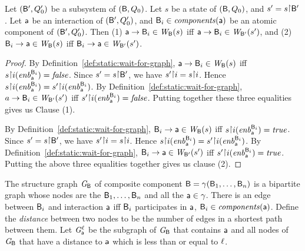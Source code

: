 \begin{proposition} \label{prop:edge-projection}
Let $(\mathsf{B}', Q'_0)$ be a subsystem of $(\mathsf{B}, Q_0)$. Let $s$ be a state of
$(\mathsf{B}, Q_0)$, and $s' = s \pj \B'$.  Let $\mathsf{a}$ be an interaction of
$(\mathsf{B}', Q'_0)$, and $\mathsf{B}_i \in \mathit{components}(\mathsf{a})$ be an atomic component of
$(\mathsf{B}', Q'_0)$.  Then (1) $\mathsf{a} \rightarrow \mathsf{B}_i \in \mathit{W}_{\mathsf{B}}({s})$ iff
$\mathsf{a} \rightarrow \mathsf{B}_i \in \mathit{W}_{\mathsf{B}'}({s'})$, and (2)
$\mathsf{B}_i \rightarrow \mathsf{a} \in \mathit{W}_{\mathsf{B}}({s})$ iff $\mathsf{B}_i \rightarrow \mathsf{a} \in \mathit{W}_{\mathsf{B}'}({s'})$.
\end{proposition}
%
\begin{proof}
By Definition~\ref{def:static:wait-for-graph}, $\mathsf{a} \rightarrow \mathsf{B}_i \in \mathit{W}_{\mathsf{B}}({s})$ iff $s \pj i (\gd{\act}{\B_i}) = \false$.
Since $s' = s \pj \B'$, we have $s' \pj i = s \pj i$. Hence
$s \pj i (\gd{\act}{\B_i}) = s' \pj i (\gd{\act}{\B_i})$.
By Definition~\ref{def:static:wait-for-graph}, 
$a \rightarrow \mathsf{B}_i \in \mathit{W}_{\mathsf{B}'}({s'})$ iff $s' \pj i (\gd{\act}{\B_i}) = \false$.
Putting together these three equalities gives us Clause (1).

By Definition~\ref{def:static:wait-for-graph},
$\mathsf{B}_i \rightarrow \mathsf{a} \in \mathit{W}_{\mathsf{B}}({s})$ iff 
$s \pj i (\gd{\act}{\B_i}) = \true$.
Since $s' = s \pj \B'$, we have $s' \pj i = s \pj i$. Hence
$s \pj i (\gd{\act}{\B_i}) = s' \pj i (\gd{\act}{\B_i})$.
By Definition~\ref{def:static:wait-for-graph},
$\mathsf{B}_i \rightarrow \mathsf{a} \in \mathit{W}_{\mathsf{B}'}({s'})$ iff $s' \pj i (\gd{\act}{\B_i}) = \true$.
Putting the above three equalities together gives us clause (2).
\end{proof}




\begin{definition} \label{def:structure-graph} The structure
graph $\mathit{G}_{\mathsf{B}}$ of composite component $\mathsf{B} = \gamma(\mathsf{B}_1,\dots,\mathsf{B}_n)$ is a
bipartite graph whose nodes are the $\mathsf{B}_1, \ldots, \mathsf{B}_n$ and all the
$\mathsf{a} \in \gamma$.  There is an edge between $\mathsf{B}_i$ and
interaction $\mathsf{a}$ iff $\mathsf{B}_i$ participates in $\mathsf{a}$, \ie $\mathsf{B}_i \in \mathit{components}(\mathsf{a})$.  Define the
\emph{distance} between two nodes to be the number of edges in a shortest path
between them.  Let $\mathit{G}_{\mathsf{a}}^{\ell}$ be the subgraph
of $\mathit{G}_{\mathsf{B}}$ that contains $\mathsf{a}$ and all nodes of $\mathit{G}_{\mathsf{B}}$
that have a distance to $\mathsf{a}$ which is less than or equal to $\ell$.
\end{definition}


